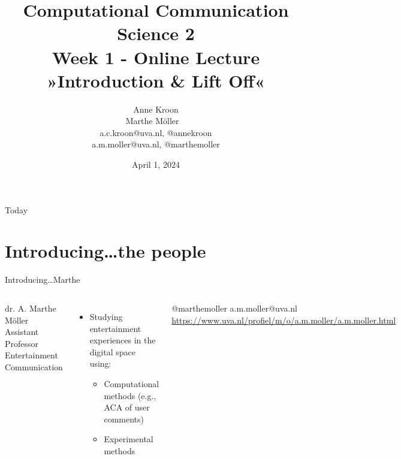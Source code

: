 \documentclass[handout]{beamer}
\title[Computational Communication Science 2]{\textbf{Computational Communication Science 2} \\Week 1 - Online Lecture\\ »Introduction \& Lift Off«}
\author[Anne Kroon, Marthe Möller]{Anne Kroon \\ Marthe Möller ~ \\ \footnotesize{a.c.kroon@uva.nl, @annekroon} \\a.m.moller@uva.nl, @marthemoller }
\date{April 1, 2024}
\institute[Digital Society Minor, University of Amsterdam]{Digital Society Minor, University of Amsterdam}
\begin{document}
	\begin{frame}{}
		\titlepage
	\end{frame}
	
\begin{frame}{Today}
	\tableofcontents
\end{frame}

\section[The people]{Introducing\ldots the people}

\begin{frame}{Introducing\ldots \huge{Marthe}} 
	\begin{columns}
		dr. A. Marthe Möller \\
		Assistant Professor Entertainment Communication
		\begin{itemize}
			\item Studying entertainment experiences in the digital space using:
			\begin{itemize}
				\item Computational methods (e.g., ACA of user comments)
				\item Experimental methods
			\end{itemize}
		\end{itemize}
		@marthemoller \textbar a.m.moller@uva.nl \textbar \url{https://www.uva.nl/profiel/m/o/a.m.moller/a.m.moller.html} 
	\end{columns}
\end{frame}
\end{document}
